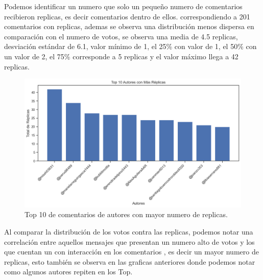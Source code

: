 Podemos identificar un numero que solo un pequeño numero de comentarios recibieron replicas, es decir comentarios dentro de ellos. correspondiendo a 201 comentarios con replicas, ademas se observa una distribución menos dispersa en comparación con el numero de votos, se observa una media de 4.5 replicas, desviación estándar de 6.1, valor mínimo de 1, el 25\% con valor de 1, el 50\% con un valor de 2, el 75\% corresponde a 5 replicas y el valor máximo llega a 42 replicas.\\

\begin{figure}[!h]
	\centering
	\includegraphics[width=15cm]{../Datos/top10autoresMasReplicas}
	\caption{Top 10 de comentarios de autores con mayor numero de replicas.}
	\label{fig:top10AMR}
\end{figure}

Al comparar la distribución de los votos contra las replicas, podemos notar una correlación entre aquellos mensajes que presentan un numero alto de votos y los que cuentan un con interacción en los comentarios , es decir un mayor numero de replicas, esto también se observa en las graficas anteriores donde podemos notar como algunos autores repiten en los Top.\\
  
